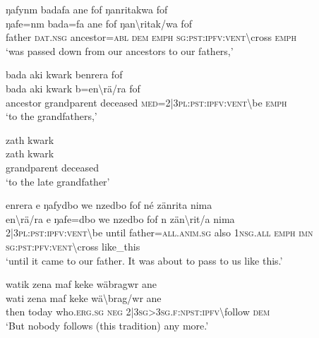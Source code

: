 \ea\label{ex:1:a3868}
ŋafynm badafa ane fof ŋanritakwa fof\\
\gll ŋafe=nm	bada=fa	ane	fof	ŋan{\textbackslash}ritak/wa	fof\\
     father	\textsc{dat}.\textsc{nsg}	ancestor=\textsc{abl}	\textsc{dem}	\textsc{emph}	\textsc{sg}:\textsc{pst}:\textsc{ipfv}:\textsc{vent}{\textbackslash}cross	\textsc{emph}\\
\glt `was passed down from our ancestors to our fathers,'
\z

\ea\label{ex:1:a3870}
bada aki kwark benrera fof\\
\gll bada	aki	kwark	b=en{\textbackslash}rä/ra	fof\\
     ancestor	grandparent	deceased	\textsc{med}=2|3\textsc{pl}:\textsc{pst}:\textsc{ipfv}:\textsc{vent}{\textbackslash}be	\textsc{emph}\\
\glt `to the grandfathers,'
\z

\ea\label{ex:1:a3871}
zath kwark\\
\gll zath	kwark\\
     grandparent	deceased\\
\glt `to the late grandfather'
\z

\ea\label{ex:1:a3872}
enrera e ŋafydbo we nzedbo fof né zänrita nima\\
\gll en{\textbackslash}rä/ra	e	ŋafe=dbo	we	nzedbo	fof	n	zän{\textbackslash}rit/a	nima\\
     2|3\textsc{pl}:\textsc{pst}:\textsc{ipfv}:\textsc{vent}{\textbackslash}be	until	father=\textsc{all}.\textsc{anim}.\textsc{sg}	also	1\textsc{nsg}.\textsc{all}	\textsc{emph}	\textsc{imn}	\textsc{sg}:\textsc{pst}:\textsc{pfv}:\textsc{vent}{\textbackslash}cross	like\_this\\
\glt `until it came to our father. It was about to pass to us like this.'
\z

\ea\label{ex:1:a3873}
watik zena maf keke wäbragwr ane\\
\gll wati	zena	maf	keke	wä{\textbackslash}brag/wr	ane\\
     then	today	who.\textsc{erg}.\textsc{sg}	\textsc{neg}	2|3\textsc{sg}>3\textsc{sg}.\textsc{f}:\textsc{npst}:\textsc{ipfv}{\textbackslash}follow	\textsc{dem}\\
\glt `But nobody follows (this tradition) any more.'
\z
